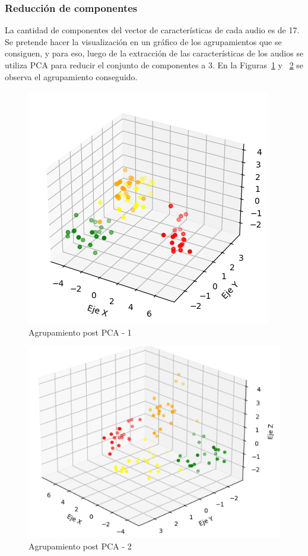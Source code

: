 \documentclass[a4paper, 12pt]{article}
\begin{document}
\subsubsection{Reducción de componentes}
La cantidad de componentes del vector de características de cada audio es de 17. Se pretende hacer la visualización en un gráfico de los agrupamientos que se consiguen, y para eso, luego de la extracción de las características de los audios se utiliza PCA para reducir el conjunto de componentes a 3. En la Figuras~\ref{GRUPOS 1} y ~\ref{GRUPOS 2} se observa el agrupamiento conseguido.
\begin{figure}[h]
    \centering
    \includegraphics[width=0.6\linewidth]{GRUPOS1.png}
    \caption{Agrupamiento post PCA - 1}
    \label{GRUPOS 1}
\end{figure}
\begin{figure}[h]
    \centering
    \includegraphics[width=0.6\linewidth]{GRUPOS2.png}
    \caption{Agrupamiento post PCA - 2}
    \label{GRUPOS 2}
\end{figure}
\end{document}
